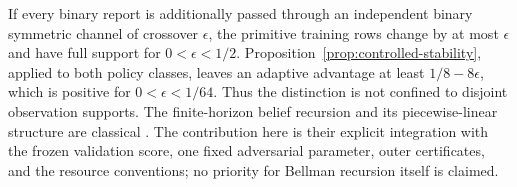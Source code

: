 If every binary report is additionally passed through an independent
binary symmetric channel of crossover $\epsilon$, the primitive
training rows change by at most $\epsilon$ and have full support for
$0<\epsilon<1/2$. Proposition~\ref{prop:controlled-stability}, applied
to both policy classes, leaves an adaptive advantage at least
$1/8-8\epsilon$, which is positive for $0<\epsilon<1/64$.
Thus the distinction is not confined to disjoint observation supports.
The finite-horizon belief recursion and its piecewise-linear structure
are classical \cite{SmallwoodSondik}. The contribution here is their
explicit integration with the frozen validation score, one fixed
adversarial parameter, outer certificates, and the resource conventions;
no priority for Bellman recursion itself is claimed.
